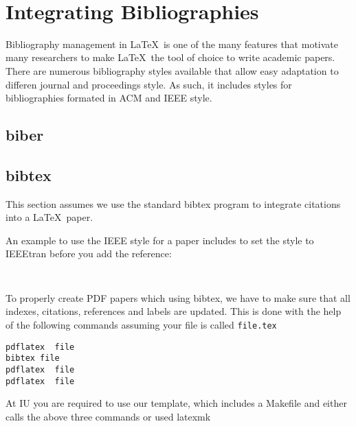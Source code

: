 
\FILENAME\

\section{Integrating Bibliographies}
\label{S:bibliographies}

Bibliography management in \LaTeX\ is one of the many features that
motivate many researchers to make \LaTeX\ the tool of choice to write
academic papers. There are numerous bibliography styles available that
allow easy adaptation to differen journal and proceedings style. As
such, it includes styles for bibliographies formated in ACM and IEEE
style.

\subsection{biber}


\subsection{bibtex}

This section assumes we use the standard bibtex program to integrate
citations into a \LaTeX\ paper.

An example to use the IEEE style for a paper includes to set
the style to IEEEtran before you add the reference:

\begin{verbatim}


\end{verbatim}

To properly create PDF papers which using bibtex, we have to make sure
that all indexes, citations, references and labels are updated. This
is done with the help of the following commands assuming your file is
called \verb|file.tex|

\begin{verbatim}
pdflatex  file
bibtex file
pdflatex  file
pdflatex  file
\end{verbatim}


\begin{IU}
At IU you are required to use our template, which includes a Makefile
and either calls the above three commands or used latexmk
\end{IU}

